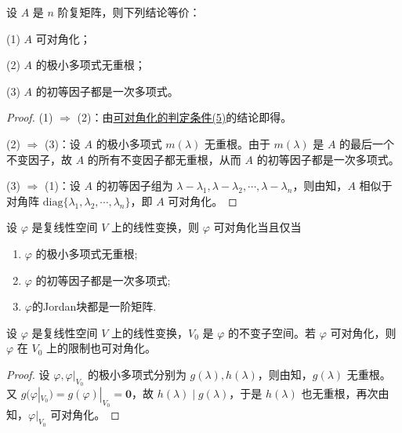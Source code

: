 \documentclass[../../main.tex]{subfiles}
\begin{document}
\begin{corollary}
设 $A$ 是 $n$ 阶复矩阵，则下列结论等价：

(1) $A$ 可对角化；

(2) $A$ 的极小多项式无重根；

(3) $A$ 的初等因子都是一次多项式。
\end{corollary}
\begin{proof}
(1) $\Rightarrow$ (2)：由\hyperref[theorem:可对角化的判定条件]{可对角化的判定条件(5)}的结论即得。

(2) $\Rightarrow$ (3)：设 $A$ 的极小多项式 $m(\lambda)$ 无重根。由于 $m(\lambda)$ 是 $A$ 的最后一个不变因子，故 $A$ 的所有不变因子都无重根，从而 $A$ 的初等因子都是一次多项式。

(3) $\Rightarrow$ (1)：设 $A$ 的初等因子组为 $\lambda - \lambda_1,\lambda - \lambda_2,\cdots,\lambda - \lambda_n$，则由知，$A$ 相似于对角阵 $\mathrm{diag}\{\lambda_1,\lambda_2,\cdots,\lambda_n\}$，即 $A$ 可对角化。

\end{proof}

\begin{corollary}\label{corollary:矩阵可对角化的几何叙述}
设 $\varphi$ 是复线性空间 $V$ 上的线性变换，则 $\varphi$ 可对角化当且仅当
\begin{enumerate}
\item $\varphi$ 的极小多项式无重根;

\item $\varphi$ 的初等因子都是一次多项式;

\item $\varphi$的Jordan块都是一阶矩阵.
\end{enumerate}
\end{corollary}

\begin{corollary}\label{corollary:线性变换可对角化则其在不变子空间的限制上也可对角化}
设 $\varphi$ 是复线性空间 $V$ 上的线性变换，$V_0$ 是 $\varphi$ 的不变子空间。若 $\varphi$ 可对角化，则 $\varphi$ 在 $V_0$ 上的限制也可对角化。
\end{corollary}
\begin{proof}
设 $\varphi,\varphi|_{V_0}$ 的极小多项式分别为 $g(\lambda),h(\lambda)$，则由知，$g(\lambda)$ 无重根。又 $g(\varphi|_{V_0}) = g(\varphi)|_{V_0} = \mathbf{0}$，故 $h(\lambda)\mid g(\lambda)$，于是 $h(\lambda)$ 也无重根，再次由知，$\varphi|_{V_0}$ 可对角化。

\end{proof}
\end{document}
